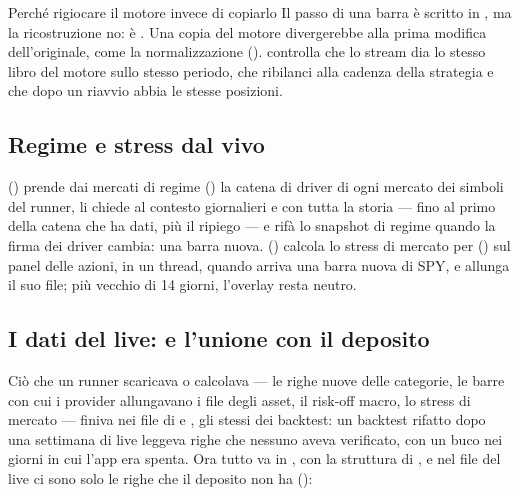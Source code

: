 \begin{perche}{Perché rigiocare il motore invece di copiarlo}
Il passo di una barra è scritto in , ma la
ricostruzione no: è . Una copia del motore
divergerebbe alla prima modifica dell'originale, come la normalizzazione
().  controlla che lo stream
dia lo stesso libro del motore sullo stesso periodo, che ribilanci alla
cadenza della strategia e che dopo un riavvio abbia le stesse posizioni.
\end{perche}

\subsection{Regime e stress dal vivo}

 () prende dai mercati di
regime () la catena di driver di ogni mercato dei
simboli del runner, li chiede al contesto giornalieri e con tutta la storia
--- fino al primo della catena che ha dati, più il ripiego  --- e
rifà lo snapshot di regime quando la firma dei driver cambia: una barra
nuova. 
() calcola lo stress di mercato per
 () sul panel delle azioni,
in un thread, quando arriva una barra nuova di SPY, e allunga il suo file;
più vecchio di \num{14} giorni, l'overlay resta neutro.

\subsection{I dati del live:  e l'unione con il deposito}\label{sez:live-dati-vivo}

Ciò che un runner scaricava o calcolava --- le righe nuove delle categorie,
le barre con cui i provider allungavano i file degli asset, il risk-off
macro, lo stress di mercato --- finiva nei file di  e
, gli stessi dei backtest: un backtest rifatto dopo una
settimana di live leggeva righe che nessuno aveva verificato, con un buco nei
giorni in cui l'app era spenta. Ora tutto va in , con la
struttura di , e nel file del live ci sono solo le righe che il
deposito non ha ():

